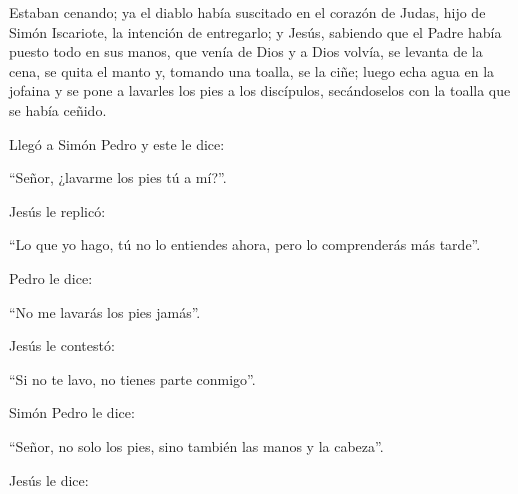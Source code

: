 			\begin{readbody}Estaban cenando; ya el diablo había suscitado en el corazón de Judas, hijo de Simón Iscariote, la intención de entregarlo; y Jesús, sabiendo que el Padre había puesto todo en sus manos, que venía de Dios y a Dios volvía, se levanta de la cena, se quita el manto y, tomando una toalla, se la ciñe; luego echa agua en la jofaina y se pone a lavarles los pies a los discípulos, secándoselos con la toalla que se había ceñido. \end{readbody}
			
			\begin{readbody}Llegó a Simón Pedro y este le dice: \end{readbody}
			
			\begin{readtalk}“Señor, ¿lavarme los pies tú a mí?”. \end{readtalk}
			
			\begin{readbody}Jesús le replicó: \end{readbody}
			
			\begin{readtalk}“Lo que yo hago, tú no lo entiendes ahora, pero lo comprenderás más tarde”. \end{readtalk}
			
			\begin{readbody}Pedro le dice: \end{readbody}
			
			\begin{readtalk}“No me lavarás los pies jamás”. \end{readtalk}
			
			\begin{readbody}Jesús le contestó: \end{readbody}
			
			\begin{readtalk}“Si no te lavo, no tienes parte conmigo”. \end{readtalk}
			
			\begin{readbody}Simón Pedro le dice: \end{readbody}
			
			\begin{readtalk}“Señor, no solo los pies, sino también las manos y la cabeza”. \end{readtalk}
			
			\begin{readbody}Jesús le dice: \end{readbody}
			
